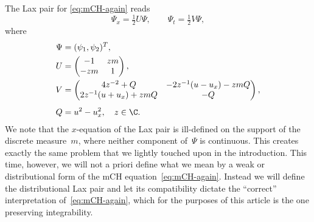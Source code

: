\documentclass[10pt,a4paper]{article} \pdfoutput=1 
\begin{document}
The Lax pair for \eqref{eq:mCH-again} reads~\cite{schiff:1996:CH-dual-hierarchies-zero-curvature-formulations, qiao:2006:mCH-new-integrable-cuspons-WMpeakons}
\begin{equation}
  \label{eq:mCH-Lax}
  \Psi_x = \tfrac12 U \Psi
  , \qquad
  \Psi_t = \tfrac12 V \Psi
  ,
\end{equation}
where
\begin{align*}
  \Psi & = (\psi_1,\psi_2)^T
  , \\
  U & = \begin{pmatrix} -1 & z m \\ -z m & 1 \end{pmatrix}
  , \\
  V &= \begin{pmatrix} 4z^{-2} + Q & -2z^{-1} (u-u_x)-z m Q \\ 2 z^{-1}(u+u_x) + z m Q & -Q \end{pmatrix}
  , \\[1ex]
  Q &= u^2-u_x^2
  , \quad
  z \in \C
  .
\end{align*}
We note that the $x$-equation of the Lax pair is ill-defined on the
support of the discrete measure~$m$, where neither component
of~$\Psi$ is continuous.
This creates exactly the same problem that we lightly touched upon in the
introduction. This time, however, we will not a priori define what we
mean by a weak or distributional form of the mCH equation~\eqref{eq:mCH-again}.
Instead we will define the distributional Lax pair and let
its compatibility dictate the ``correct'' interpretation of~\eqref{eq:mCH-again},
which for the purposes of this article is the one preserving integrability.
\end{document}
